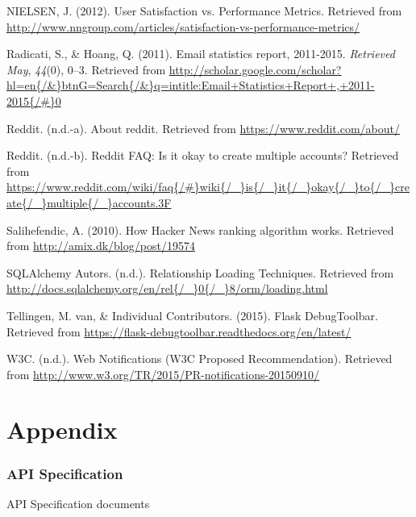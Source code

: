 NIELSEN, J. (2012). User Satisfaction vs. Performance Metrics. Retrieved
from
\url{http://www.nngroup.com/articles/satisfaction-vs-performance-metrics/}

Radicati, S., \& Hoang, Q. (2011). Email statistics report, 2011-2015.
\emph{Retrieved May}, \emph{44}(0), 0--3. Retrieved from
\url{http://scholar.google.com/scholar?hl=en\{/\&\}btnG=Search\{/\&\}q=intitle:Email+Statistics+Report+,+2011-2015\{/\#\}0}

Reddit. (n.d.-a). About reddit. Retrieved from
\url{https://www.reddit.com/about/}

Reddit. (n.d.-b). Reddit FAQ: Is it okay to create multiple accounts?
Retrieved from
\url{https://www.reddit.com/wiki/faq\{/\#\}wiki\{/_\}is\{/_\}it\{/_\}okay\{/_\}to\{/_\}create\{/_\}multiple\{/_\}accounts.3F}

Salihefendic, A. (2010). How Hacker News ranking algorithm works.
Retrieved from \url{http://amix.dk/blog/post/19574}

SQLAlchemy Autors. (n.d.). Relationship Loading Techniques. Retrieved
from
\url{http://docs.sqlalchemy.org/en/rel\{/_\}0\{/_\}8/orm/loading.html}

Tellingen, M. van, \& Individual Contributors. (2015). Flask
DebugToolbar. Retrieved from
\url{https://flask-debugtoolbar.readthedocs.org/en/latest/}

W3C. (n.d.). Web Notifications (W3C Proposed Recommendation). Retrieved
from \url{http://www.w3.org/TR/2015/PR-notifications-20150910/}

\appendix

\part*{Appendix}

\section{API Specification}\label{api-specification}

API Specification documents


